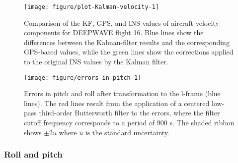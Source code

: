 \documentclass[12pt,twoside,english,12pt,twoside,english]{article}\usepackage[]{graphicx}\usepackage[]{color}
\makeatletter
\def\maxwidth{ %
  \ifdim\Gin@nat@width>\linewidth
    \linewidth
  \else
    \Gin@nat@width
  \fi
}
\newenvironment{knitrout}{}{} %
\makeatother
\begin{document}
\begin{knitrout}
\color{fgcolor}\begin{figure}

{\centering \texttt{[image: figure/plot-Kalman-velocity-1]} 

}

\caption[Comparison of the Kalman filter, GPS, and INS values for aircraft-velocity components, with corrections from the Kalman filter also shown.]{Comparison of the KF, GPS, and INS values of aircraft-velocity components for DEEPWAVE flight 16. Blue lines show the differences between the Kalman-filter results and the corresponding GPS-based values, while the green lines show the corrections applied to the original INS values by the Kalman filter.}\label{fig:plot-Kalman-velocity}
\end{figure}


\end{knitrout}

\newpage

\begin{knitrout}
\color{fgcolor}\begin{figure}

{\centering \texttt{[image: figure/errors-in-pitch-1]} 

}

\caption[Errors in pitch and roll after transformation to the l-frame with a filtered result and bands of uncertainty.]{Errors in pitch and roll after transformation to the l-frame (blue lines). The red lines result from the application of a centered low-pass third-order Butterworth filter to the errors, where the filter cutoff frequency corresponds to a period of 900 s. The shaded ribbon shows $\pm2u$ where $u$ is the standard uncertainty.}\label{fig:errors-in-pitch}
\end{figure}


\end{knitrout}

\subsubsection{Roll and pitch\label{subsec:Roll-and-pitch}}
\end{document}
